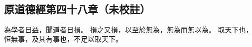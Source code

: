 ﻿%
%

\chapter{~}

\section{原道德經第四十八章（未校註）}

\begin{withgezhu}

\zhsong


為學者日益，\textcolor{tongjia-color}{聞道}者日損。
損之又損，以至於無為，無為而無以為。
取天下也，恒無事，及其有事也，不足以取天下。

\end{withgezhu}
